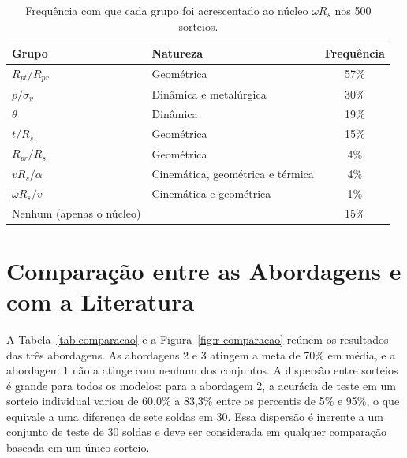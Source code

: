 \documentclass[12pt,openany]{report}
\begin{document}
\begin{table}[htbp]
\centering
\caption{Frequência com que cada grupo foi acrescentado ao núcleo $\omega R_s$ nos 500 sorteios.}
\label{tab:res_abord3}
\small
\begin{tabular}{llc}
\toprule
\textbf{Grupo} & \textbf{Natureza} & \textbf{Frequência} \\ \midrule
$R_{pt}/R_{pr}$ & Geométrica & 57\% \\
$p/\sigma_y$ & Dinâmica e metalúrgica & 30\% \\
$\theta$ & Dinâmica & 19\% \\
$t/R_s$ & Geométrica & 15\% \\
$R_{pr}/R_s$ & Geométrica & 4\% \\
$vR_s/\alpha$ & Cinemática, geométrica e térmica & 4\% \\
$\omega R_s/v$ & Cinemática e geométrica & 1\% \\ \midrule
Nenhum (apenas o núcleo) & & 15\% \\ \bottomrule
\end{tabular}
\end{table}

\section{Comparação entre as Abordagens e com a Literatura}
\label{sec:comparacao}

A Tabela~\ref{tab:comparacao} e a Figura~\ref{fig:r-comparacao} reúnem os resultados das três abordagens. As abordagens 2 e 3 atingem a meta de 70\% em média, e a abordagem 1 não a atinge com nenhum dos conjuntos. A dispersão entre sorteios é grande para todos os modelos: para a abordagem 2, a acurácia de teste em um sorteio individual variou de 60,0\% a 83,3\% entre os percentis de 5\% e 95\%, o que equivale a uma diferença de sete soldas em 30. Essa dispersão é inerente a um conjunto de teste de 30 soldas e deve ser considerada em qualquer comparação baseada em um único sorteio.
\end{document}
